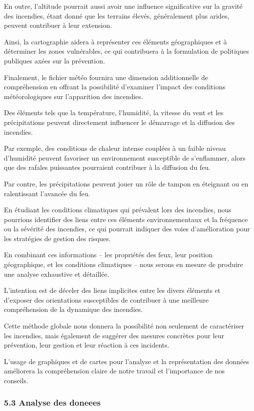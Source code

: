 \documentclass[
]{article}
\begin{document}
En outre, l'altitude pourrait aussi avoir une influence significative
sur la gravité des incendies, étant donné que les terrains élevés,
généralement plus arides, peuvent contribuer à leur extension.

Ainsi, la cartographie aidera à représenter ces éléments géographiques
et à déterminer les zones vulnérables, ce qui contribuera à la
formulation de politiques publiques axées sur la prévention.

Finalement, le fichier météo fournira une dimension additionnelle de
compréhension en offrant la possibilité d'examiner l'impact des
conditions météorologiques sur l'apparition des incendies.

Des éléments tels que la température, l'humidité, la vitesse du vent et
les précipitations peuvent directement influencer le démarrage et la
diffusion des incendies.

Par exemple, des conditions de chaleur intense couplées à un faible
niveau d'humidité peuvent favoriser un environnement susceptible de
s'enflammer, alors que des rafales puissantes pourraient contribuer à la
diffusion du feu.

Par contre, les précipitations peuvent jouer un rôle de tampon en
éteignant ou en ralentissant l'avancée du feu.

En étudiant les conditions climatiques qui prévalent lors des incendies,
nous pourrions identifier des liens entre ces éléments environnementaux
et la fréquence ou la sévérité des incendies, ce qui pourrait indiquer
des voies d'amélioration pour les stratégies de gestion des risques.

En combinant ces informations -- les propriétés des feux, leur position
géographique, et les conditions climatiques -- nous serons en mesure de
produire une analyse exhaustive et détaillée.

L'intention est de déceler des liens implicites entre les divers
éléments et d'exposer des orientations susceptibles de contribuer à une
meilleure compréhension de la dynamique des incendies.

Cette méthode globale nous donnera la possibilité non seulement de
caractériser les incendies, mais également de suggérer des mesures
concrètes pour leur prévention, leur gestion et leur réaction à ces
incidents.

L'usage de graphiques et de cartes pour l'analyse et la représentation
des données améliorera la compréhension claire de notre travail et
l'importance de nos conseils.

\subsubsection{5.3 Analyse des doneees}\label{analyse-des-doneees}
\end{document}
